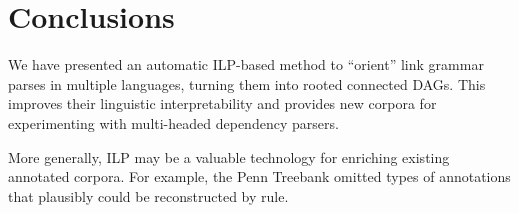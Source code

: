 \documentclass[11pt]{article}
\begin{document}

\section{Conclusions}

We have presented an automatic ILP-based method to ``orient'' link grammar parses in multiple languages, turning them into rooted connected DAGs.  This improves their linguistic interpretability and provides new corpora for experimenting with multi-headed dependency parsers.  

More generally, ILP may be a valuable technology for enriching existing annotated corpora.  For example, the Penn Treebank \cite{TREEBANK-1993} omitted types of annotations that plausibly could be reconstructed by rule.

\newpage




\appendix
\clearpage
\onecolumn
\end{document}
